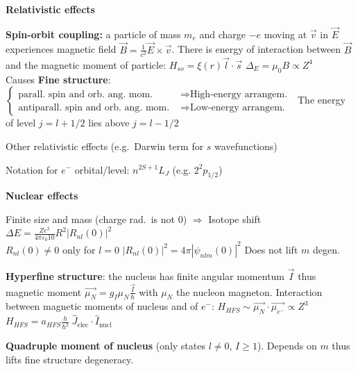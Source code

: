 \textbf{Relativistic effects}
\begin{squishlist}
    \item \textbf{Spin-orbit coupling:} a particle of mass $m_e$ and charge $-e$ moving at $\vec{v}$ in $\vec{E}$ experiences magnetic field $\vec{B} = \frac{1}{c^2}\vec{E}\times \vec{v}$. There is energy of interaction between $\vec{B}$ and the magnetic moment of particle: $H_{so} = \xi(r) \vec{l}\cdot \vec{s}$ \qquad $\Delta_E = \mu_0 B \propto Z^4$\\
    Causes \textbf{Fine structure}: $\left\{\begin{aligned}
        \text{parall.\ spin and orb.\ ang.\ mom.\ } &\Rightarrow \text{High-energy arrangem.\ } \\
        \text{antiparall.\ spin and orb.\ ang.\ mom.\ } &\Rightarrow \text{Low-energy arrangem.\ }
    \end{aligned} \right.$
    The energy of level $j = l+1/2$ lies above $j = l-1/2$

    \item Other relativistic effects (e.g.\ Darwin term for $s$ wavefunctions)
    \item Notation for $e^-$ orbital/level: $n^{2S+1}L_J$ (e.g. $2^2 p_{1/2}$)
\end{squishlist}

\squishline

\textbf{Nuclear effects}
\begin{squishlist}
    \item Finite size and mass (charge rad.\ is not 0) $\Rightarrow$
    Isotope shift $\Delta E = \frac{Ze^2}{4 \pi \varepsilon_0 10}R^2 |R_{nl}(0)|^2$ \\ $R_{nl}(0) \neq 0$ only for $l=0$ \quad $|R_{nl}(0)|^2 = 4\pi |\psi_{nlm}(0)|^2$ \quad Does not lift $m$ degen.\
    \item \textbf{Hyperfine structure}: the nucleus has finite angular momentum $\vec{I}$ thus magnetic moment $\vec{\mu_N} = g_I \mu_N \frac{\vec{I}}{\hbar}$ with $\mu_N$ the nucleon magneton.
    Interaction between magnetic moments of nucleus and of $e^-$:
    $H_{HFS} \sim \vec{\mu_N}\cdot \vec{\mu_{e^-}} \propto Z^3$ \\
    $H_{HFS} = a_{HFS} \frac{h}{\hbar^2} \; \hat{J}_{\text{elec}}\cdot \hat{I}_{\text{nucl}}$
    \item \textbf{Quadruple moment of nucleus} (only states $l \neq 0$, $I \geq 1$). Depends on $m$ thus lifts fine structure degeneracy.
\end{squishlist}

